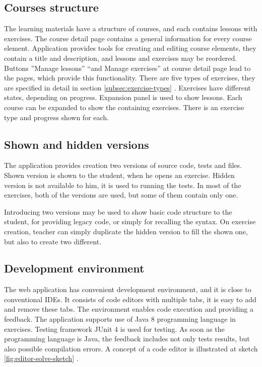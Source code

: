         \subsection{Courses structure}
        The learning materials have a structure of courses, and each contains lessons with exercises. The course detail page contains a general information for every course element. Application provides tools for creating and editing course elements, they contain a title and description, and lessons and exercises may be reordered. Buttons ''Manage lessons'' ``and Manage exercises'' at course detail page lead to the pages, which provide this functionality. There are five types of exercises, they are specified in detail in section \ref{subsec:exercise-types} . Exercises have different states, depending on progress. Expansion panel is used to show lessons. Each course can be expanded to show the containing exercises. There is an exercise type and progress shown for each.
        
        \subsection{Shown and hidden versions}
        The application provides creation two versions of source code, tests and files. Shown version is shown to the student, when he opens an exercise. Hidden version is not available to him, it is used to running the tests. In most of the exercises, both of the versions are used, but some of them contain only one.
        
        Introducing two versions may be used to show basic code structure to the student, for providing legacy code, or simply for recalling the syntax. On exercise creation, teacher can simply duplicate the hidden version to fill the shown one, but also to create two different.
        
        \subsection{Development environment}
        The web application has convenient development environment, and it is close to conventional IDEs. It consists of code editors with multiple tabs, it is easy to add and remove these tabs. The environment enables code execution and providing a feedback. The application supports use of Java 8 programming language in exercises. Testing framework JUnit 4 is used for testing. As soon as the programming language is Java, the feedback includes not only tests results, but also possible compilation errors. A concept of a code editor is illustrated at sketch \ref{fig:editor-solve-sketch} .
        
